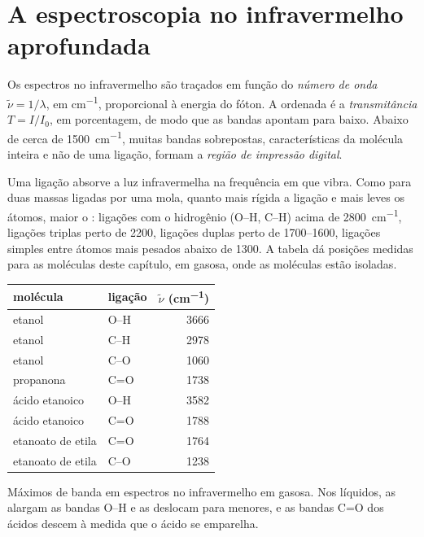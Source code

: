 \section{A espectroscopia no infravermelho aprofundada}

\begin{definition}\label{def:b1:structure-spectroscopy:wavenumber}
Os espectros no infravermelho são traçados em função do \emph{número de
onda} $\tilde\nu = 1/\lambda$, em \unit{cm^{-1}},
proporcional à energia do fóton. A ordenada é a
\emph{transmitância} $T = I/I_0$, em porcentagem, de modo
que as bandas apontam para baixo. Abaixo de cerca de
\qty{1500}{cm^{-1}}, muitas bandas sobrepostas, características da
molécula inteira e não de uma ligação, formam a \emph{região de
impressão digital}.
\end{definition}

Uma ligação absorve a luz infravermelha na frequência em que vibra. Como
para duas massas ligadas por uma mola, quanto mais rígida a ligação e
mais leves os átomos, maior o : ligações com o hidrogênio
(O--H, C--H) acima de \qty{2800}{cm^{-1}}, ligações triplas perto de
2200, ligações duplas perto de 1700--1600, ligações simples entre átomos
mais pesados abaixo de 1300. A tabela dá posições medidas para as
moléculas deste capítulo, em  gasosa, onde as moléculas estão
isoladas.
\begin{omfigure}
\begin{tabular}{llr}
\hline
molécula & ligação & $\tilde\nu$ (\unit{cm^{-1}}) \\
\hline
etanol & O--H & 3666 \\
etanol & C--H & 2978 \\
etanol & C--O & 1060 \\
propanona & C=O & 1738 \\
ácido etanoico & O--H & 3582 \\
ácido etanoico & C=O & 1788 \\
etanoato de etila & C=O & 1764 \\
etanoato de etila & C--O & 1238 \\
\hline
\end{tabular}

\smallskip
{\small Máximos de banda em espectros no infravermelho em  gasosa.
Nos líquidos, as  alargam as bandas O--H e as
deslocam para  menores, e as bandas C=O dos ácidos
descem à medida que o ácido se emparelha.}
\end{omfigure}

